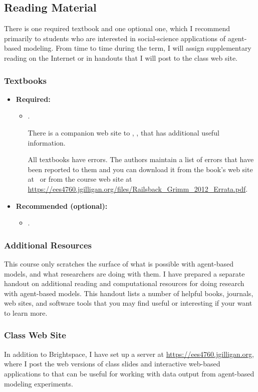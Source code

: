 \documentclass[11pt,twoside]{jgsyllabus}\usepackage[]{graphicx}\usepackage[]{xcolor}
\begin{document}
\subsection{Reading Material}
There is one required textbook and one optional one, which I recommend primarily
to students who are interested in social-science applications of agent-based
modeling.
From time to time during the term, I will assign supplementary reading on the
Internet or in handouts that I will post to the class web site.

\subsubsection{Textbooks}
\begin{itemize}
  \item \textbf{Required:}
    \begin{itemize}
	    \item \LongRailsback.

      There is a companion web site to \emph{\Railsback}, \RailsbackURL, that
      has additional useful information.

      All textbooks have errors. The authors maintain a list of errors that have
      been reported to them and you can download it from the book's web site at
      \RailsbackURL\ or from the course web site at
      \url{https://ees4760.jgilligan.org/files/Railsback_Grimm_2012_Errata.pdf}.
    \end{itemize}

  \item \textbf{Recommended (optional):}
    \begin{itemize}
	    \item \LongSmaldino.
    \end{itemize}
\end{itemize}

\subsubsection{Additional Resources}
This course only scratches the surface of what is possible with agent-based
models, and what researchers are doing with them.
I have prepared a separate handout on additional reading and computational
resources for doing research with agent-based models.
This handout lists a number of helpful books, journals, web sites, and software
tools that you may find useful or interesting if your want to learn more.

\subsubsection{Class Web Site}
In addition to Brightspace,
I have set up a server at \url{https://ees4760.jgilligan.org}, where I post the
web versions of class slides and interactive web-based applications to that can
be useful for working with data output from agent-based modeling experiments.
\end{document}
